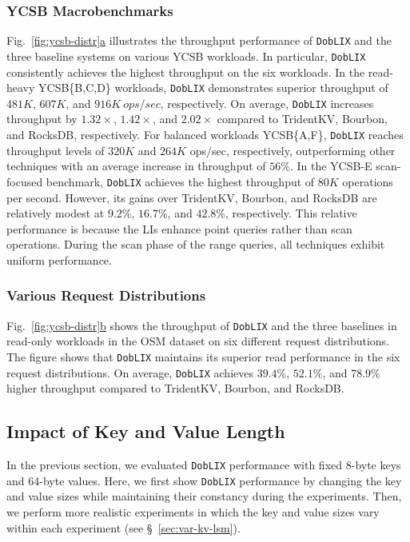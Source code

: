 \subsubsection{\textbf{YCSB Macrobenchmarks}}
\label{sec:eval:ycsb}
Fig.~\hyperref[fig:ycsb-distr]{\ref*{fig:ycsb-distr}a} illustrates the throughput performance of \texttt{DobLIX} and the three baseline systems on various YCSB workloads. In particular, \texttt{DobLIX} consistently achieves the highest throughput on the six workloads.
In the read-heavy YCSB\{B,C,D\} workloads, \texttt{DobLIX} demonstrates superior throughput of $481K$, $607K$, and $916K~ops/sec$, respectively. On average, \texttt{DobLIX} increases throughput by $1.32\times$, $1.42\times$, and $2.02\times$ compared to TridentKV, Bourbon, and RocksDB, respectively.
For balanced workloads YCSB\{A,F\}, \texttt{DobLIX} reaches throughput levels of $320K$ and $264K$ ops/sec, respectively, outperforming other techniques with an average increase in throughput of $56\%$.
In the YCSB-E scan-focused benchmark, \texttt{DobLIX} achieves the highest throughput of $80K$ operations per second. However, its gains over TridentKV, Bourbon, and RocksDB are relatively modest at $9.2\%$, $16.7\%$, and $42.8\%$, respectively. This relative performance is because the LIs enhance point queries rather than scan operations. During the scan phase of the range queries, all techniques exhibit uniform performance.

\subsubsection{\textbf{Various Request Distributions}}
\label{sec:eval:req-distr}
Fig.~\hyperref[fig:ycsb-distr]{\ref*{fig:ycsb-distr}b} shows the throughput of \texttt{DobLIX} and the three baselines in read-only workloads in the OSM dataset on six different request distributions. The figure shows that \texttt{DobLIX} maintains its superior read performance in the six request distributions. On average, \texttt{DobLIX} achieves $39.4\%$, $52.1\%$, and $78.9\%$ higher throughput compared to TridentKV, Bourbon, and RocksDB.

\subsection{Impact of Key and Value Length}
\label{sec:eval:kvlen}

In the previous section, we evaluated \texttt{DobLIX} performance with fixed $8$-byte keys and $64$-byte values. Here, we first show \texttt{DobLIX} performance by changing the key and value sizes while maintaining their constancy during the experiments. Then, we perform more realistic experiments in which the key and value sizes vary within each experiment (see \S~\ref{sec:var-kv-lsm}).

